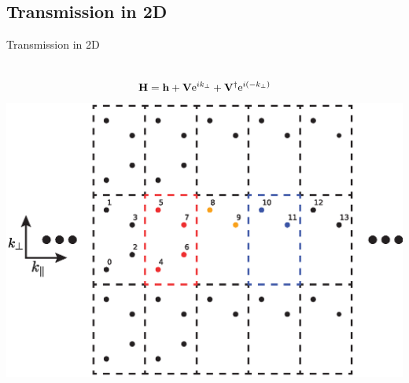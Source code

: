 \documentclass[hyperref={colorlinks=true,urlcolor=blue,linkcolor=.},aspectratio=1610,mathserif]{beamer}
\newcommand{\me}{\mathrm{e}}
\newcommand{\im}[3]{\inputminted[linenos=true, python3=true, firstline=#2, lastline=#3]{python}{#1}}
\begin{document}
\subsection{Transmission in 2D}

\begin{frame}{Transmission in 2D}
	\centering
	\begin{columns}[c]
		\begin{align*}
			\vb{H} = \vb{h} + \vb{V}\me^{ik_{\perp}} + \vb{V}^{\dagger} \me^{i\pqty{-k_{\perp}}}
		\end{align*}
		\includegraphics[width=.7\textwidth]{Figures/2DTrans.eps}
	\end{columns}
	\begin{columns}[c]
		\im{Listings/Functions.py}{250}{253}
	\end{columns}

\end{frame}
\end{document}
